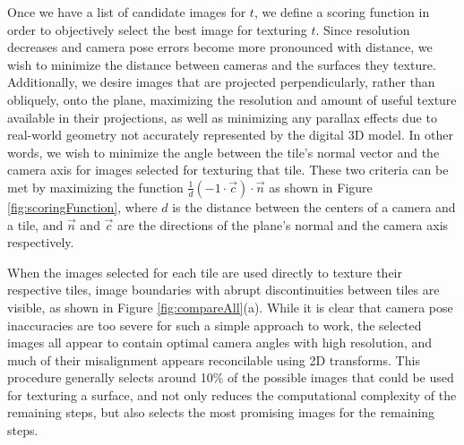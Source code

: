 \documentclass[]{spie}  %
\begin{document}
Once we have a list of candidate images for $t$, we define a scoring
function in order to objectively select the best image for texturing
$t$. Since resolution decreases and camera pose errors become more
pronounced with distance, we wish to minimize the distance between
cameras and the surfaces they texture. Additionally, we desire images
that are projected perpendicularly, rather than obliquely, onto the
plane, maximizing the resolution and amount of useful texture
available in their projections, as well as minimizing any parallax
effects due to real-world geometry not accurately represented by the
digital 3D model. In other words, we wish to minimize the angle
between the tile's normal vector and the camera axis for images
selected for texturing that tile. These two criteria can be met by
maximizing the function $\frac{1}{d} (-1 \cdot \vec{c}) \cdot \vec{n}$
as shown in Figure \ref{fig:scoringFunction}, where $d$ is the
distance between the centers of a camera and a tile, and $\vec{n}$ and
$\vec{c}$ are the directions of the plane's normal and the camera axis
respectively.

When the images selected for each tile are used directly to texture
their respective tiles, image boundaries with abrupt discontinuities
between tiles are visible, as shown in Figure
\ref{fig:compareAll}(a). While it is clear that camera pose
inaccuracies are too severe for such a simple approach to work, the
selected images all appear to contain optimal camera angles with high
resolution, and much of their misalignment appears reconcilable using
2D transforms. This procedure generally selects around 10\% of the
possible images that could be used for texturing a surface, and not
only reduces the computational complexity of the remaining steps, but
also selects the most promising images for the remaining steps.
\end{document}
